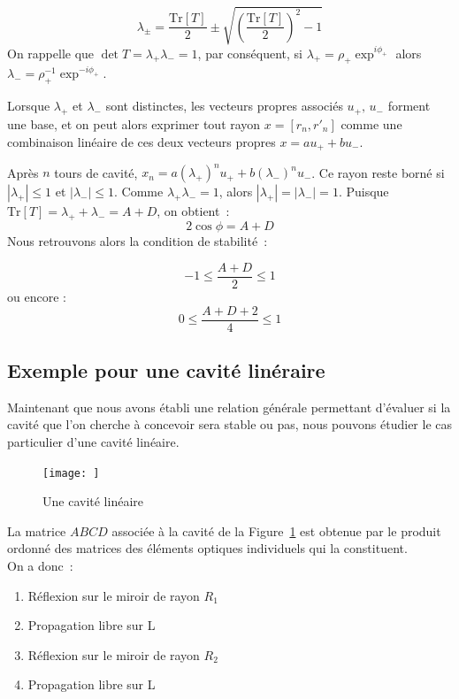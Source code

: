 \documentclass[a4paper]{book}
\newcommand{\Tr}[1]{\mathrm{Tr}\left[{#1}\right]}
\begin{document}
\begin{equation}
\label{eq:eigenval}
    \lambda_\pm=
    \frac{\Tr{T}}{2}
    \pm
    \sqrt{
    \left(
    \frac{\Tr{T}}
    {2}
    \right)^2-1
    }
\end{equation}
On rappelle que  $\det{T}=\lambda_{+}\lambda_{-} = 1$, par conséquent, si $\lambda_+ = \rho_+\exp^{i\phi_+}$ alors $\lambda_- = \rho_+^{-1}\exp^{-i\phi_+}$. 

Lorsque $\lambda_{+}$ et $\lambda_{-}$ sont distinctes, les vecteurs propres associés $u_{+},\,u_{-}$ forment une base, et on peut alors exprimer tout rayon $x = \left[r_n, r'_n\right]$ comme une combinaison linéaire de ces deux vecteurs propres $x = au_{+}+bu_{-}$. 

Après $n$ tours de cavité, $x_n = a(\lambda_+)^nu_{+}+b(\lambda_-)^nu_{-}$. Ce rayon reste borné si $|\lambda_+|\leq1$ et $|\lambda_-|\leq1$. Comme $\lambda_{+}\lambda_{-} = 1$, alors $|\lambda_+|=|\lambda_-|=1$. 
Puisque $\Tr{T}=\lambda_+ + \lambda_-=A+D$, on obtient~:
\begin{equation}
    2\cos\phi = A + D
\end{equation}
Nous retrouvons alors la condition de stabilité~:

\begin{equation}
    -1\leq \frac{A+D}{2}\leq 1
\end{equation}
ou encore :
\begin{equation}
    0 \leq \frac{A+D+2}{4}\leq 1
\end{equation}

\subsection{Exemple pour une cavité linéraire}\label{subsec:ex_cavlin}


Maintenant que nous avons établi une relation générale permettant d'évaluer si la cavité que l'on cherche à concevoir sera stable ou pas, nous pouvons étudier le cas particulier d'une cavité linéaire.

\begin{figure}[!htbp]
\begin{center}
\texttt{[image: ]}
\end{center}
\caption{Une cavité linéaire}
\label{fig:image_cavite_lineaire}
\end{figure}

La matrice $ABCD$ associée à la cavité de la Figure~\ref{fig:image_cavite_lineaire} est obtenue par le produit ordonné des matrices des éléments optiques individuels qui la constituent. \\
On a donc~:
\begin{enumerate}
    \item Réflexion sur le miroir de rayon $R_1$
    \item Propagation libre sur L
    \item Réflexion sur le miroir de rayon $R_2$
    \item Propagation libre sur L 
\end{enumerate}
\end{document}
